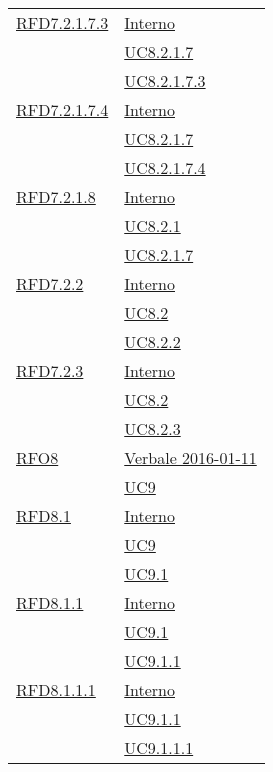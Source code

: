 \begin{longtable}{|>{\centering}m{5cm}|m{5cm}<{\centering}|}
\hyperlink{RFD7.2.1.7.3}{RFD7.2.1.7.3} & \hyperlink{Interno}{Interno}\\
& \hyperref[UC8.2.1.7]{UC8.2.1.7}\\
& \hyperref[UC8.2.1.7.3]{UC8.2.1.7.3}\\ \hline

\hyperlink{RFD7.2.1.7.4}{RFD7.2.1.7.4} & \hyperlink{Interno}{Interno}\\
& \hyperref[UC8.2.1.7]{UC8.2.1.7}\\
& \hyperref[UC8.2.1.7.4]{UC8.2.1.7.4}\\ \hline

\hyperlink{RFD7.2.1.8}{RFD7.2.1.8} & \hyperlink{Interno}{Interno}\\
& \hyperref[UC8.2.1]{UC8.2.1}\\
& \hyperref[UC8.2.1.7]{UC8.2.1.7}\\ \hline

\hyperlink{RFD7.2.2}{RFD7.2.2} & \hyperlink{Interno}{Interno}\\
& \hyperref[UC8.2]{UC8.2}\\
& \hyperref[UC8.2.2]{UC8.2.2}\\ \hline

\hyperlink{RFD7.2.3}{RFD7.2.3} & \hyperlink{Interno}{Interno}\\
& \hyperref[UC8.2]{UC8.2}\\
& \hyperref[UC8.2.3]{UC8.2.3}\\ \hline

\hyperlink{RFO8}{RFO8} & \hyperlink{Verbale 2016-01-11}{Verbale 2016-01-11}\\
& \hyperref[UC9]{UC9}\\ \hline

\hyperlink{RFD8.1}{RFD8.1} & \hyperlink{Interno}{Interno}\\
& \hyperref[UC9]{UC9}\\
& \hyperref[UC9.1]{UC9.1}\\ \hline

\hyperlink{RFD8.1.1}{RFD8.1.1} & \hyperlink{Interno}{Interno}\\
& \hyperref[UC9.1]{UC9.1}\\
& \hyperref[UC9.1.1]{UC9.1.1}\\ \hline

\hyperlink{RFD8.1.1.1}{RFD8.1.1.1} & \hyperlink{Interno}{Interno}\\
& \hyperref[UC9.1.1]{UC9.1.1}\\
& \hyperref[UC9.1.1.1]{UC9.1.1.1}\\ \hline


\end{longtable}
